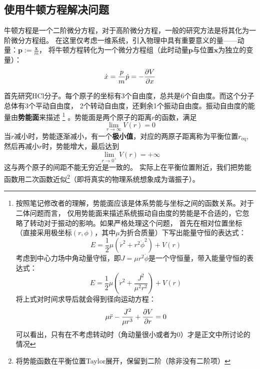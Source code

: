     \subsection{使用牛顿方程解决问题}
    牛顿方程是一个二阶微分方程，对于高阶微分方程，一般的研究方法是将其化为一阶微分方程组。
    在这里仅考虑一维系统，引入物理中具有重要意义的量——动量：$\bm{p} := \frac{\dot{\bm{x}}}{m}$，
    将牛顿方程转化为一个微分方程组（此时动量$\bm{p}$与位置$\bm{x}$为独立的变量）：
    \begin{equation}
        \dot{x} = \frac pm\\
        \dot{p} = -\frac {\partial V}{\partial x}
    \end{equation}
    \par
    首先研究HCl分子。每个原子的坐标有3个自由度，总共是6个自由度。而这个分子总体有3个平动自由度，
    2个转动自由度，还剩余1个振动自由度。振动自由度的能量由\textbf{势能面}来描述
    \footnote{按照笔记修改者的理解，势能面应该是体系势能与坐标之间的函数关系。对于二体问题而言，
    仅用势能面来描述系统振动自由度的势能是不合适的，它忽略了转动对于振动的影响。如果严格处理这个问题，
    首先在相对位置坐标（直接采用极坐标$(r, \phi)$，其中$\mu$为折合质量）下写出能量守恒的表达式：
    \begin{equation}
        E = \frac{1}{2}\mu\left(\dot{r}^2 + r^2\dot{\phi}^2\right) + V(r)
    \end{equation}
    考虑到中心力场中角动量守恒，即$J = \mu r^2 \dot{\phi}$是一个守恒量，带入能量守恒的表达式：
    \begin{equation}
        E = \frac{1}{2}\mu\left(\dot{r}^2 + \frac{J^2}{\mu^2r^2}\right) + V(r)
    \end{equation}
    将上式对时间求导后就会得到径向运动方程：
    \begin{equation}
        \mu \ddot{r} - \frac{J^2}{\mu r^3} + \frac{\partial{V}}{\partial{r}} = 0
    \end{equation}
    可以看出，只有在不考虑转动时（角动量很小或者为0）才是正文中所讨论的情况
    }
    。势能面是两个原子的距离$r$的函数，满足
    \begin{equation}
        \lim_{r \to \infty} V(r) = 0
    \end{equation}
    当$r$减小时，势能逐渐减小，有一个\textbf{极小值}，对应的两原子距离称为平衡位置$r_\mathrm{eq}$, 然后再减小$r$时，势能增大，最后达到
    \begin{equation}
        \lim_{r \to 0^+} V(r) = +\infty
    \end{equation}
    这与两个原子的间距不能无穷近是一致的。
    实际上在平衡位置附近，我们把势能函数用二次函数近似\footnote{
        将势能函数在平衡位置Taylor展开，保留到二阶（除非没有二阶项）
    }（即将真实的物理系统想象成为谐振子）。
